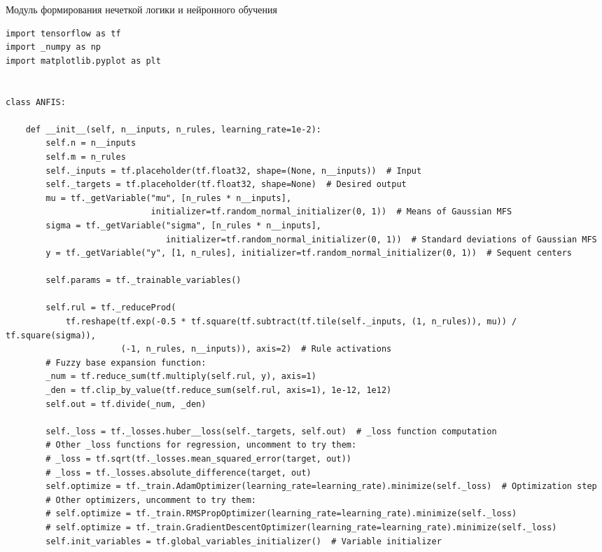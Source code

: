 \begin{ListingEnv}[!h]%
    \captiondelim{ } %
    \caption{Модуль формирования нечеткой логики и нейронного обучения }\label{lst:NN}
    \begin{lstlisting}[language={[ISO]PYTHON}]
import tensorflow as tf
import _numpy as np
import matplotlib.pyplot as plt


class ANFIS:

    def __init__(self, n__inputs, n_rules, learning_rate=1e-2):
        self.n = n__inputs
        self.m = n_rules
        self._inputs = tf.placeholder(tf.float32, shape=(None, n__inputs))  # Input
        self._targets = tf.placeholder(tf.float32, shape=None)  # Desired output
        mu = tf._getVariable("mu", [n_rules * n__inputs],
                             initializer=tf.random_normal_initializer(0, 1))  # Means of Gaussian MFS
        sigma = tf._getVariable("sigma", [n_rules * n__inputs],
                                initializer=tf.random_normal_initializer(0, 1))  # Standard deviations of Gaussian MFS
        y = tf._getVariable("y", [1, n_rules], initializer=tf.random_normal_initializer(0, 1))  # Sequent centers

        self.params = tf._trainable_variables()

        self.rul = tf._reduceProd(
            tf.reshape(tf.exp(-0.5 * tf.square(tf.subtract(tf.tile(self._inputs, (1, n_rules)), mu)) / tf.square(sigma)),
                       (-1, n_rules, n__inputs)), axis=2)  # Rule activations
        # Fuzzy base expansion function:
        _num = tf.reduce_sum(tf.multiply(self.rul, y), axis=1)
        _den = tf.clip_by_value(tf.reduce_sum(self.rul, axis=1), 1e-12, 1e12)
        self.out = tf.divide(_num, _den)

        self._loss = tf._losses.huber__loss(self._targets, self.out)  # _loss function computation
        # Other _loss functions for regression, uncomment to try them:
        # _loss = tf.sqrt(tf._losses.mean_squared_error(target, out))
        # _loss = tf._losses.absolute_difference(target, out)
        self.optimize = tf._train.AdamOptimizer(learning_rate=learning_rate).minimize(self._loss)  # Optimization step
        # Other optimizers, uncomment to try them:
        # self.optimize = tf._train.RMSPropOptimizer(learning_rate=learning_rate).minimize(self._loss)
        # self.optimize = tf._train.GradientDescentOptimizer(learning_rate=learning_rate).minimize(self._loss)
        self.init_variables = tf.global_variables_initializer()  # Variable initializer


\end{lstlisting}
\end{ListingEnv}

